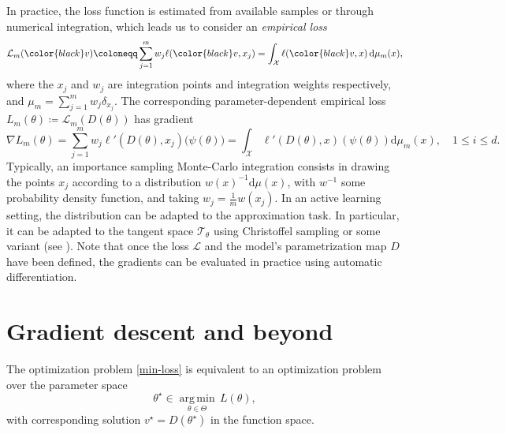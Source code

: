 \documentclass{article}
\theoremstyle{noparens}
\newcommand{\cL}{\mathcal{L}}
\newcommand{\cX}{\mathcal{X}}
\newcommand{\dd}{\mathrm{d}}
\DeclareMathOperator*{\argmin}{arg\,min}
\newcommand{\colorM}{\color{black}}
\renewcommand{\v}{{\colorM v}}
\begin{document}
In  practice, the loss function is  estimated from available samples or through numerical integration, which leads us to consider an \emph{empirical loss}
\begin{align*}
       \cL_m(\v) \coloneqq  \sum_{j=1}^m w_j\ell(\v , x_j) = \int_{\cX} \ell(\v , x)\, \dd\mu_m(x),
\end{align*}
where the $x_j$ and $w_j$ are integration points and integration weights respectively, and $\mu_m = \sum_{j=1}^m w_j \delta_{x_j}$. The corresponding parameter-dependent empirical loss $L _m(\theta) \coloneqq \cL_m(D(\theta))$ has gradient
$$
\nabla L_m(\theta)  =  \sum_{j=1}^m w_j   \ell'(D(\theta) , x_j) \big(\psi(\theta)\big) = \int_\cX \ell'(D(\theta),x)(\psi(\theta)) \dd\mu_m(x), \quad 1\le i \le d.
$$
Typically, an importance sampling  Monte-Carlo integration consists in drawing the points $x_j$ according to a distribution $w(x)^{-1} \dd \mu(x)$, with $w^{-1} $ some probability density function, and taking $w_j = \frac{1}{m} w(x_j)$. In an active learning setting, the distribution can be adapted to the approximation task. In particular, it can be adapted to
the tangent space $\mathcal{T}_\theta$  using Christoffel sampling or some variant (see \cite{gruhlkeOptimalSamplingStochastic2024,Adcock2024Sep,Nouy2025}).
Note that once the loss $\cL$ and the model's parametrization map $D$ have been defined, the gradients can be evaluated in practice  using automatic differentiation.







\section{Gradient descent and beyond}
\label{sec:gradient-descent}

The optimization problem \eqref{min-loss} is equivalent to an optimization problem over the parameter space
$$\theta^\star \in \underset{\theta\in \Theta}{\argmin} \, L(\theta),$$
with corresponding solution $v^\star = D(\theta^\star)$ in the function space.
\end{document}
